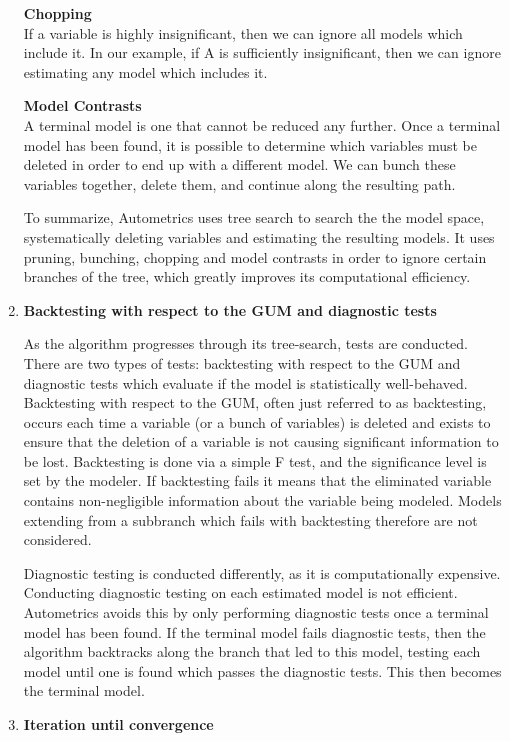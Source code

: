 \documentclass[11pt, oneside]{book}   	%
\begin{document}
\begin{enumerate}
\textbf{Chopping}\\
If a variable is highly insignificant, then we can ignore all models which include it. In our example, if A is sufficiently insignificant, then we can ignore estimating any model which includes it. 

\textbf{Model Contrasts}\\
A terminal model is one that cannot be reduced any further. Once a terminal model has been found, it is possible to determine which variables must be deleted in order to end up with a different model. We can bunch these variables together, delete them, and continue along the resulting path. 

To summarize, Autometrics uses tree search to search the the model space, systematically deleting variables and estimating the resulting models. It uses pruning, bunching, chopping and model contrasts in order to ignore certain branches of the tree, which greatly improves its computational efficiency. 

\item \textbf{Backtesting with respect to the GUM and diagnostic tests}

As the algorithm progresses through its tree-search, tests are conducted. There are two types of tests: backtesting with respect to the GUM and diagnostic tests which evaluate if the model is statistically well-behaved. Backtesting with respect to the GUM, often just referred to as backtesting, occurs each time a variable (or a bunch of variables) is deleted and exists to ensure that the deletion of a variable is not causing significant information to be lost. Backtesting is done via a simple F test, and the significance level is set by the modeler. If backtesting fails it means that the eliminated variable contains non-negligible information about the variable being modeled. Models extending from a subbranch which fails with backtesting therefore are not considered.

Diagnostic testing is conducted differently, as it is computationally expensive. Conducting diagnostic testing on each estimated model is not efficient. Autometrics avoids this by only performing diagnostic tests once a terminal model has been found. If the terminal model fails diagnostic tests, then the algorithm backtracks along the branch that led to this model, testing each model until one is found which passes the diagnostic tests. This then becomes the terminal model. 

\item \textbf{Iteration until convergence}


\end{enumerate}
\end{document}

